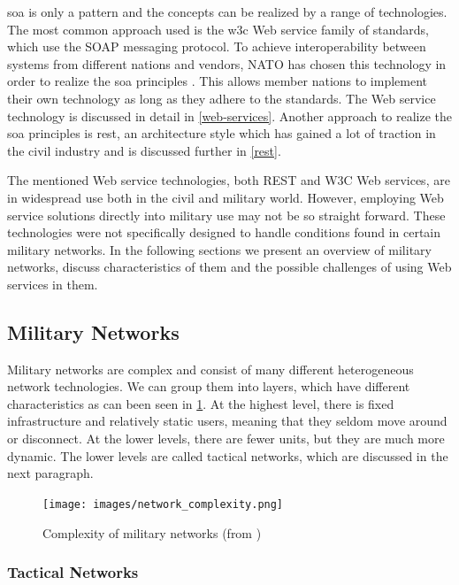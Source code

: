 \gls{soa} is only a pattern and the concepts can be realized by a range of
technologies. The most common approach used is the \gls{w3c} Web service family
of standards, which use the SOAP messaging protocol. To achieve interoperability
between systems from different nations and vendors, NATO has chosen this
technology in order to realize the \gls{soa} principles \cite{soa-baseline}. This
allows member nations to implement their own technology as long as they adhere
to the standards. The Web service technology is discussed in detail in
\cref{web-services}. Another approach to realize the \gls{soa} principles is
\gls{rest}, an architecture style which has gained a lot of traction in the
civil industry and is discussed further in \cref{rest}.

The mentioned Web service technologies, both REST and W3C Web services, are in
widespread use both in the civil and military world. However, employing Web
service solutions directly into military use may not be so straight forward.
These technologies were not specifically designed to handle conditions found in
certain military networks. In the following sections we present an overview of
military networks, discuss characteristics of them and the possible challenges
of using Web services in them.

\subsection{Military Networks}

Military networks are complex and consist of many different heterogeneous
network technologies. We can group them into layers, which have different
characteristics as can been seen in \cref{figure:military-networks}. At the
highest level, there is fixed infrastructure and relatively static users,
meaning that they seldom move around or disconnect. At the lower levels, there
are fewer units, but they are much more dynamic. The lower levels are called
tactical networks, which are discussed in the next paragraph.

\begin{figure}[h]
\texttt{[image: images/network\_complexity.png]}
\caption{Complexity of military networks (from \cite{pervasive-web})}
\label{figure:military-networks}
\end{figure}

\subsubsection{Tactical Networks}

